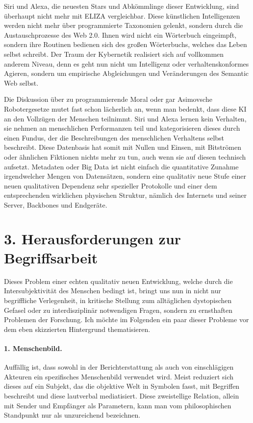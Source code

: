 \documentclass[12pt,a4paper]{article}
\begin{document}
Siri und Alexa, die neuesten Stars und Abkömmlinge dieser Entwicklung, sind
überhaupt nicht mehr mit ELIZA vergleichbar. Diese künstlichen Intelligenzen
werden nicht mehr über programmierte Taxonomien gelenkt, sondern durch die
Austauschprozesse des Web 2.0. Ihnen wird nicht ein Wörterbuch eingeimpft,
sondern ihre Routinen bedienen sich des großen Wörterbuchs, welches das Leben
selbst schreibt. Der Traum der Kybernetik realisiert sich auf vollkommen
anderem Niveau, denn es geht nun nicht um Intelligenz oder verhaltenskonformes
Agieren, sondern um empirische Abgleichungen und Veränderungen des Semantic
Web selbst.

Die Diskussion über zu programmierende Moral oder gar Asimovsche
Robotergesetze mutet fast schon lächerlich an, wenn man bedenkt, dass diese KI
an den Vollzügen der Menschen teilnimmt. Siri und Alexa lernen kein Verhalten,
sie nehmen an menschlichen Performanzen teil und kategorisieren dieses durch
einen Fundus, der die Beschreibungen des menschlichen Verhaltens selbst
beschreibt.  Diese Datenbasis hat somit mit Nullen und Einsen, mit Bitströmen
oder ähnlichen Fiktionen nichts mehr zu tun, auch wenn sie auf diesen
technisch aufsetzt. Metadaten oder Big Data ist nicht einfach die quantitative
Zunahme irgendwelcher Mengen von Datensätzen, sondern eine qualitativ neue
Stufe einer neuen qualitativen Dependenz sehr spezieller Protokolle und einer
dem entsprechenden wirklichen physischen Struktur, nämlich des Internets und
seiner Server, Backbones und Endgeräte.

\section*{3. Herausforderungen zur Begriffsarbeit}

Dieses Problem einer echten qualitativ neuen Entwicklung, welche durch die
Intersubjektivität des Menschen bedingt ist, bringt uns nun in nicht nur
begriffliche Verlegenheit, in kritische Stellung zum alltäglichen dystopischen
Gefasel oder zu interdisziplinär notwendigen Fragen, sondern zu ernsthaften
Problemen der Forschung. Ich möchte im Folgenden ein paar dieser Probleme vor
dem eben skizzierten Hintergrund thematisieren.
\enlargethispage{1em}

\paragraph{1. Menschenbild.}
Auffällig ist, dass sowohl in der Berichterstattung als auch von einschlägigen
Akteuren ein spezifisches Menschenbild verwendet wird. Meist reduziert sich
dieses auf ein Subjekt, das die objektive Welt in Symbolen fasst, mit
Begriffen beschreibt und diese lautverbal mediatisiert. Diese zweistellige
Relation, allein mit Sender und Empfänger als Parametern, kann man vom
philosophischen Standpunkt nur als unzureichend bezeichnen.
\end{document}
